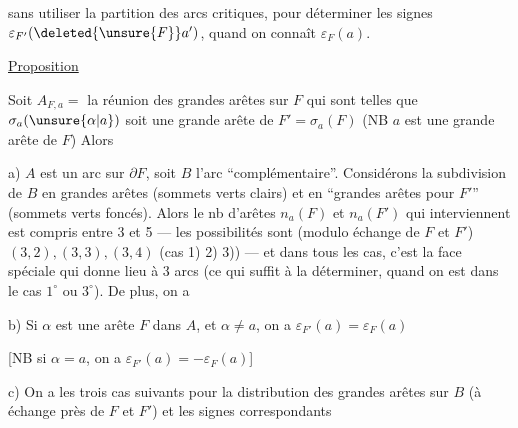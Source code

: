 
\uline{} sans utiliser la partition des arcs critiques, pour déterminer les signes  $\varepsilon_{F'}(\deleted{\unsure{F}}a')$, quand on connaît   $\varepsilon_F(a)$.

\uline{Proposition} 

Soit $A_{F,a}=$  la réunion des grandes arêtes \inserted{$\alpha$} sur $F$ qui sont telles que $\sigma_a(\unsure{\alpha|a})$ soit une grande arête de $F'=\sigma_a(F)$  (NB $a$ est une grande arête de $F$) Alors

a) $A$ est un arc sur $\partial F$, soit $B$ l'arc ``complémentaire''.  Considérons la subdivision de $B$ en grandes arêtes (sommets verts clairs) et en ``grandes arêtes pour $F'$'' (sommets verts foncés). Alors le nb d'arêtes $n_a(F)$ et $n_a(F')$ qui interviennent est  compris entre 3 et 5 --- les possibilités sont (modulo échange de $F$ et $F'$) $(3,2),(3,3),(3,4)$   (cas 1) 2) 3)) --- et dans tous les cas, c'est la face spéciale qui donne lieu à 3 arcs (ce qui suffit à la déterminer, quand on est dans le cas $1^\circ$ ou $3^\circ$). De plus, on a

b) Si $\alpha$ est une  arête  $F$ dans $A$,   et $\alpha\ne a$, on a $\varepsilon_{F'}(a)=\varepsilon_F(a)$

[NB si $\alpha=a$, on a $\varepsilon_{F'}(a)=-\varepsilon_F(a)$]

c) On a les  trois cas suivants  pour la distribution des grandes arêtes sur $B$ (à échange près de $F$ et $F'$) et les signes correspondants


